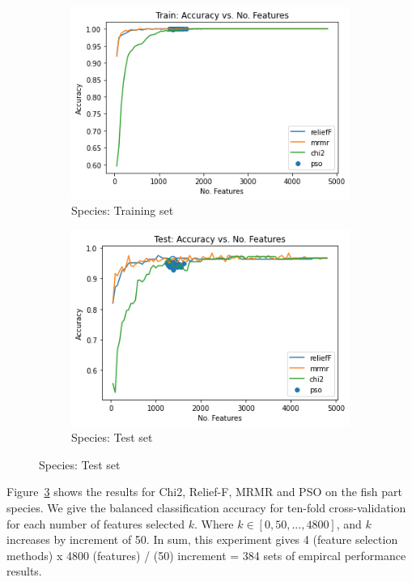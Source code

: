 \documentclass[runningheads]{llncs}
\begin{document}
\begin{figure}[htb]
  \centering
  \caption[Two numerical solutions]{
      FS Classification Accuracy per $k$
    }
  \begin{subfigure}[b]{.55\linewidth}
    \includegraphics[width=\linewidth]{accuracy-features-fish-train.png}
    \caption{Species: Training set}\label{fig:fs-per-k-fish-train}
  \end{subfigure}
  \begin{subfigure}[b]{.55\linewidth}
    \includegraphics[width=\linewidth]{accuracy-features-fish-test.png}
    \caption{Species: Test set}\label{fig:fs-per-k-fish-test}
  \end{subfigure}
  \label{fig:fs-per-k-fish}
\end{figure}

Figure~\ref{fig:fs-per-k-fish} shows the results for Chi2, Relief-F, MRMR and PSO on the fish part species. 
We give the balanced classification accuracy for ten-fold cross-validation for each number of features selected $k$.
Where $k \in [0,50,...,4800]$, and $k$ increases by increment of 50.
In sum, this experiment gives 4 (feature selection methods) x 4800 (features) / (50) increment = 384 sets of empircal performance results. 
\end{document}
